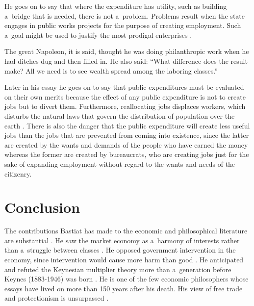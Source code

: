 He goes on to say that where the expenditure has utility, such as building a~bridge that is needed, there is not a~problem. Problems result when the state engages in public works projects for the purpose of creating employment. Such a~goal might be used to justify the most prodigal enterprises 
\parencite[][p.17]{bastiat_selected_1964}.%




The great Napoleon, it is said, thought he was doing philanthropic work when he had ditches dug and then filled in. He also said: ``What difference does the result make? All we need is to see wealth spread among the laboring classes.'' 
\parencite[][p.18]{bastiat_selected_1964}%




Later in his essay he goes on to say that public expenditures must be evaluated on their own merits because the effect of any public expenditure is not to create jobs but to divert them. Furthermore, reallocating jobs displaces workers, which disturbs the natural laws that govern the distribution of population over the earth 
\parencite[][p.41]{bastiat_selected_1964}. %
 There is also the danger that the public expenditure will create less useful jobs than the jobs that are prevented from coming into existence, since the latter are created by the wants and demands of the people who have earned the money whereas the former are created by bureaucrats, who are creating jobs just for the sake of expanding employment without regard to the wants and needs of the citizenry.



\section{Conclusion}

The contributions Bastiat has made to the economic and philosophical literature are substantial 
\parencite[][]{mcgee_relevance_2014}. %
 He saw the market economy as a~harmony of interests rather than a~struggle between classes 
\parencite[][]{braun_bastiat_2011}. %
 He opposed government intervention in the economy, since intervention would cause more harm than good 
\parencite[][]{hulsmann_bastiats_2001}. %
 He anticipated and refuted the Keynesian multiplier theory more than a~generation before Keynes (1883-1946) was born 
\parencite[][]{mcgee_keynes_2014}. %
 He is one of the few economic philosophers whose essays have lived on more than 150 years after his death. His view of free trade and protectionism is unsurpassed 
\parencite[][]{mcgee_economic_2014}.%




